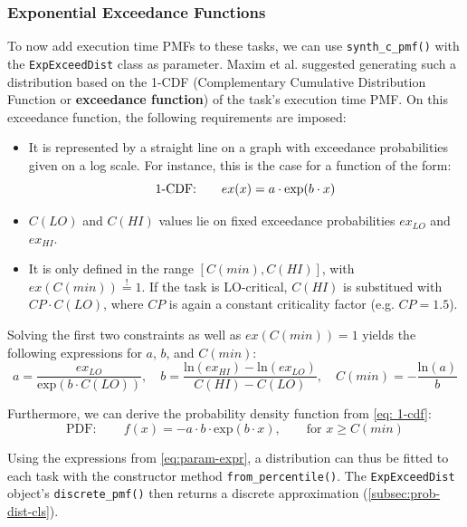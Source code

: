 \documentclass[a4paper,oneside]{csthesis}
\begin{document}
\subsubsection{Exponential Exceedance Functions}
To now add execution time PMFs to these tasks, we can use \texttt{synth\_c\_pmf()} with the \texttt{ExpExceedDist} class as parameter. Maxim et al. \cite{maxim2016probabilistic} suggested generating such a distribution based on the 1-CDF (Complementary Cumulative Distribution Function or \textbf{exceedance function}) of the task's execution time PMF. On this exceedance function, the following requirements are imposed:
\begin{itemize}
    \item It is represented by a straight line on a graph with exceedance probabilities given on a log scale. For instance, this is the case for a function of the form:
    \begin{equation}
    \label{eq: 1-cdf}
        \text{1-CDF:\qquad} ex(x) = a \cdot \text{exp}(b \cdot x)
    \end{equation}
    \item $C(LO)$ and $C(HI)$ values lie on fixed exceedance probabilities $ex_{LO}$ and $ex_{HI}$.
    \item It is only defined in the range $[C(min), C(HI)]$, with $ex(C(min)) \overset{!}{=} 1$. If the task is LO-critical, $C(HI)$ is substitued with $CP \cdot C(LO)$, where $CP$ is again a constant criticality factor (e.g. $CP = 1.5$).
\end{itemize}
Solving the first two constraints as well as $ex(C(min)) = 1$ yields the following expressions for $a$, $b$, and $C(min)$:
\begin{equation}
\label{eq:param-expr}
    a = \frac{ex_{LO}}{\text{exp}(b \cdot C(LO))}, \quad b = \frac{\text{ln}(ex_{HI}) - \text{ln}(ex_{LO})}{C(HI) - C(LO)}, \quad C(min) = - \frac{\text{ln}(a)}{b}
\end{equation}

Furthermore, we can derive the probability density function from \cref{eq: 1-cdf}:
\begin{equation}
    \text{PDF}: \qquad f(x) = - a \cdot b \cdot \text{exp}(b \cdot x), \qquad \text{for $x \geq C(min)$}
\end{equation}

Using the expressions from \cref{eq:param-expr}, a distribution can thus be fitted to each task with the constructor method \texttt{from\_percentile()}. The \texttt{ExpExceedDist} object's \texttt{discrete\_pmf()} then returns a discrete approximation (\cref{subsec:prob-dist-cls}).
\end{document}
